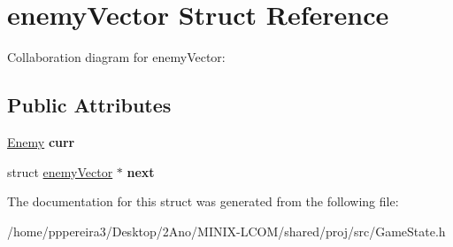 \hypertarget{structenemyVector}{}\section{enemy\+Vector Struct Reference}
\label{structenemyVector}


Collaboration diagram for enemy\+Vector\+:
\subsection*{Public Attributes}
\begin{DoxyCompactItemize}
\item 
\hyperlink{structenemy__t}{Enemy} {\bfseries curr}
\item 
struct \hyperlink{structenemyVector}{enemy\+Vector} $\ast$ {\bfseries next}
\end{DoxyCompactItemize}


The documentation for this struct was generated from the following file\+:\begin{DoxyCompactItemize}
\item 
/home/pppereira3/\+Desktop/2\+Ano/\+M\+I\+N\+I\+X-\/\+L\+C\+O\+M/shared/proj/src/Game\+State.\+h\end{DoxyCompactItemize}
